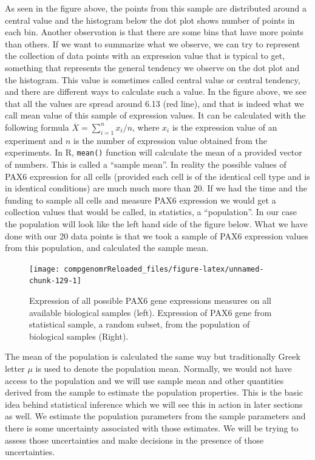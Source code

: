 \documentclass[12pt,]{krantz}
\begin{document}
As seen in the figure above, the points from this sample are distributed around
a central value and the histogram below the dot plot shows number of points in
each bin. Another observation is that there are some bins that have more points than others. If we want to summarize what we observe, we can try
to represent the collection of data points
with an expression value that is typical to get, something that represents the
general tendency we observe on the dot plot and the histogram. This value is
sometimes called central
value or central tendency, and there are different ways to calculate such a value.
In the figure above, we see that all the values are spread around 6.13 (red line),
and that is indeed what we call mean value of this sample of expression values.
It can be calculated with the following formula \(\overline{X}=\sum_{i=1}^n x_i/n\),
where \(x_i\) is the expression value of an experiment and \(n\) is the number of
expression value obtained from the experiments. In R, \texttt{mean()} function will calculate the
mean of a provided vector of numbers. This is called a ``sample mean''. In reality
the possible values of PAX6 expression for all cells (provided each cell is of the
identical cell type and is in identical conditions) are much much more than 20.
If we had the time and the funding to sample all cells and measure PAX6 expression we would
get a collection values that would be called, in statistics, a ``population''. In
our case the population will look like the left hand side of the figure below. What we have done with
our 20 data points is that we took a sample of PAX6 expression values from this
population, and calculated the sample mean.

\begin{figure}

{\centering \texttt{[image: compgenomrReloaded\_files/figure-latex/unnamed-chunk-129-1]} 

}

\caption{Expression of all possible PAX6 gene expressions measures on all available biological samples (left). Expression of PAX6 gene from statistical sample, a random subset, from the population of biological samples (Right). }\label{fig:unnamed-chunk-129}
\end{figure}

The mean of the population is calculated the same way but traditionally
Greek letter \(\mu\) is used to denote the population mean. Normally, we would not
have access to the population and we will use sample mean and other quantities
derived from the sample to estimate the population properties. This is the basic
idea behind statistical inference which we will see this in action in later
sections as well. We
estimate the population parameters from the sample parameters and there is some
uncertainty associated with those estimates. We will be trying to assess those
uncertainties and make decisions in the presence of those uncertainties.
\end{document}
